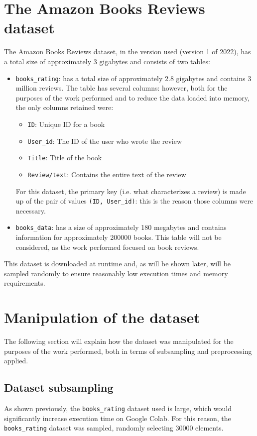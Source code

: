 \documentclass[12pt, a4paper]{article}
\begin{document}
\section{The Amazon Books Reviews dataset}

The Amazon Books Reviews dataset, in the version used (version 1 of 2022), has a total size of approximately 3 gigabytes and consists of two tables:
\begin{itemize}
    \item \texttt{books\_rating}: has a total size of approximately 2.8 gigabytes 
    and contains 3 million reviews. The table has several columns: however, both 
    for the purposes of the work performed and to reduce the data loaded into memory, 
    the only columns retained were:
    \begin{itemize}
        \item \texttt{ID}: Unique ID for a book
        \item \texttt{User\_id}: The ID of the user who wrote the review
        \item \texttt{Title}: Title of the book
        \item \texttt{Review/text}: Contains the entire text of the review
    \end{itemize}
    For this dataset, the primary key (i.e. what characterizes a review) is made up of the pair of values \texttt{(ID, User\_id)}: this is the reason those columns were necessary. 
    \item \texttt{books\_data}: has a size of approximately 180 megabytes and 
    contains information for approximately 200000 books. 
    This table will not be considered, as the work performed focused on book reviews.
\end{itemize}
This dataset is downloaded at runtime and, as will be shown later, will be sampled randomly to ensure reasonably low execution times and memory requirements.


\section{Manipulation of the dataset}
The following section will explain how the dataset was manipulated for the purposes of the work performed, both in terms of subsampling and preprocessing applied.
\subsection{Dataset subsampling}
As shown previously, the \texttt{books\_rating} dataset used is large, which would significantly increase execution time on Google Colab. For this reason, the \texttt{books\_rating} dataset was sampled, randomly selecting 30000 elements.
\end{document}
